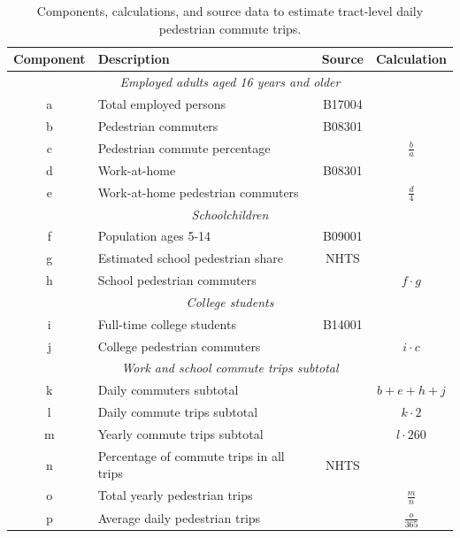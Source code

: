 \documentclass[paper=letterpaper, fontsize=11pt]{scrartcl}
\begin{document}
\begin{table}[!htbp]
	\renewcommand*{\arraystretch}{1.4}
	\caption{Components, calculations, and source data to estimate tract-level daily pedestrian commute trips.}
	\label{EstimationMethods}
	\centering
	\begin{tabular}{|c l c c|} 
		\hline
		\textbf{Component} & \textbf{Description} & \textbf{Source} & \textbf{Calculation} \\
		\hline
		\multicolumn{4}{c}{\textit{Employed adults aged 16 years and older}}\\
		\hline
		a & Total employed persons & B17004 & \\ 
		\hline
		b & Pedestrian commuters & B08301 & \\ 
		\hline
		c & Pedestrian commute percentage & & $\frac{b}{a}$ \\ 
		\hline
		d & Work-at-home & B08301 & \\ 
		\hline
		e & Work-at-home pedestrian commuters & & $\frac{d}{4}$ \\
		\hline
		\multicolumn{4}{c}{\textit{Schoolchildren}}\\
		\hline
		f & Population ages 5-14 & B09001 & \\
		\hline
		g & Estimated school pedestrian share & NHTS & \\
		\hline
		h & School pedestrian commuters & & $f \cdot g$ \\
		\hline
		\multicolumn{4}{c}{\textit{College students}}\\
		\hline
		i & Full-time college students & B14001 & \\
		\hline
		j & College pedestrian commuters & & $i \cdot c$ \\
		\hline
		\multicolumn{4}{c}{\textit{Work and school commute trips subtotal}}\\
		\hline
		k & Daily commuters subtotal & & $ b + e + h + j $ \\
		\hline
		l & Daily commute trips subtotal & & $k \cdot 2$ \\
		\hline
		m & Yearly commute trips subtotal & & $l \cdot 260$ \\
		\hline
		n & Percentage of commute trips in all trips & NHTS & \\
		\hline
		o & Total yearly pedestrian trips & & $\frac{m}{n}$ \\
		\hline
		p & Average daily pedestrian trips & & $\frac{o}{365}$ \\
		\hline
	\end{tabular}
\end{table} 
\end{document}
